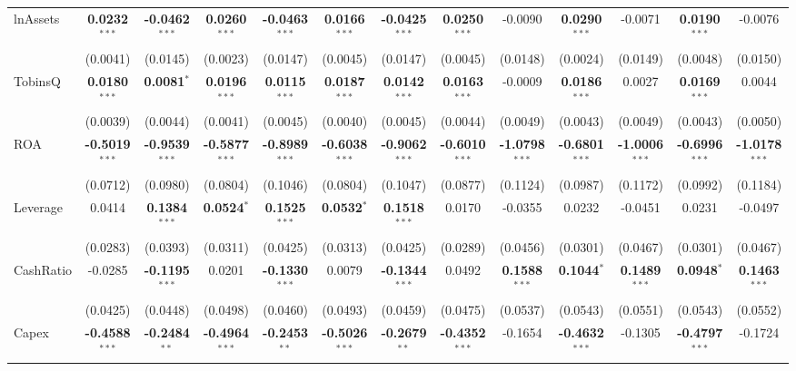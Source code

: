 \documentclass[11pt,a4paper]{article}
\begin{document}
\begin{table}[htbp]
\begin{tabular}{lcccccccccccc}
\midrule
lnAssets & \textbf{0.0232}$^{***}$ & \textbf{-0.0462}$^{***}$ & \textbf{0.0260}$^{***}$ & \textbf{-0.0463}$^{***}$ & \textbf{0.0166}$^{***}$ & \textbf{-0.0425}$^{***}$ & \textbf{0.0250}$^{***}$ & -0.0090 & \textbf{0.0290}$^{***}$ & -0.0071 & \textbf{0.0190}$^{***}$ & -0.0076 \\
 & (0.0041) & (0.0145) & (0.0023) & (0.0147) & (0.0045) & (0.0147) & (0.0045) & (0.0148) & (0.0024) & (0.0149) & (0.0048) & (0.0150) \\
TobinsQ & \textbf{0.0180}$^{***}$ & \textbf{0.0081}$^{*}$ & \textbf{0.0196}$^{***}$ & \textbf{0.0115}$^{***}$ & \textbf{0.0187}$^{***}$ & \textbf{0.0142}$^{***}$ & \textbf{0.0163}$^{***}$ & -0.0009 & \textbf{0.0186}$^{***}$ & 0.0027 & \textbf{0.0169}$^{***}$ & 0.0044 \\
 & (0.0039) & (0.0044) & (0.0041) & (0.0045) & (0.0040) & (0.0045) & (0.0044) & (0.0049) & (0.0043) & (0.0049) & (0.0043) & (0.0050) \\
ROA & \textbf{-0.5019}$^{***}$ & \textbf{-0.9539}$^{***}$ & \textbf{-0.5877}$^{***}$ & \textbf{-0.8989}$^{***}$ & \textbf{-0.6038}$^{***}$ & \textbf{-0.9062}$^{***}$ & \textbf{-0.6010}$^{***}$ & \textbf{-1.0798}$^{***}$ & \textbf{-0.6801}$^{***}$ & \textbf{-1.0006}$^{***}$ & \textbf{-0.6996}$^{***}$ & \textbf{-1.0178}$^{***}$ \\
 & (0.0712) & (0.0980) & (0.0804) & (0.1046) & (0.0804) & (0.1047) & (0.0877) & (0.1124) & (0.0987) & (0.1172) & (0.0992) & (0.1184) \\
Leverage & 0.0414 & \textbf{0.1384}$^{***}$ & \textbf{0.0524}$^{*}$ & \textbf{0.1525}$^{***}$ & \textbf{0.0532}$^{*}$ & \textbf{0.1518}$^{***}$ & 0.0170 & -0.0355 & 0.0232 & -0.0451 & 0.0231 & -0.0497 \\
 & (0.0283) & (0.0393) & (0.0311) & (0.0425) & (0.0313) & (0.0425) & (0.0289) & (0.0456) & (0.0301) & (0.0467) & (0.0301) & (0.0467) \\
CashRatio & -0.0285 & \textbf{-0.1195}$^{***}$ & 0.0201 & \textbf{-0.1330}$^{***}$ & 0.0079 & \textbf{-0.1344}$^{***}$ & 0.0492 & \textbf{0.1588}$^{***}$ & \textbf{0.1044}$^{*}$ & \textbf{0.1489}$^{***}$ & \textbf{0.0948}$^{*}$ & \textbf{0.1463}$^{***}$ \\
 & (0.0425) & (0.0448) & (0.0498) & (0.0460) & (0.0493) & (0.0459) & (0.0475) & (0.0537) & (0.0543) & (0.0551) & (0.0543) & (0.0552) \\
Capex & \textbf{-0.4588}$^{***}$ & \textbf{-0.2484}$^{**}$ & \textbf{-0.4964}$^{***}$ & \textbf{-0.2453}$^{**}$ & \textbf{-0.5026}$^{***}$ & \textbf{-0.2679}$^{**}$ & \textbf{-0.4352}$^{***}$ & -0.1654 & \textbf{-0.4632}$^{***}$ & -0.1305 & \textbf{-0.4797}$^{***}$ & -0.1724 \\

\end{tabular}
\end{table}
\end{document}
